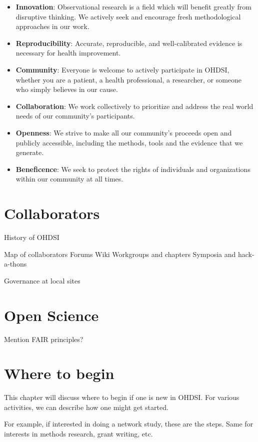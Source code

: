 \documentclass[11pt]{book}
\begin{document}
\begin{itemize}
\item
  \textbf{Innovation}: Observational research is a field which will
  benefit greatly from disruptive thinking. We actively seek and
  encourage fresh methodological approaches in our work.
\item
  \textbf{Reproducibility}: Accurate, reproducible, and well-calibrated
  evidence is necessary for health improvement.
\item
  \textbf{Community}: Everyone is welcome to actively participate in
  OHDSI, whether you are a patient, a health professional, a researcher,
  or someone who simply believes in our cause.
\item
  \textbf{Collaboration}: We work collectively to prioritize and address
  the real world needs of our community's participants.
\item
  \textbf{Openness}: We strive to make all our community's proceeds open
  and publicly accessible, including the methods, tools and the evidence
  that we generate.
\item
  \textbf{Beneficence}: We seek to protect the rights of individuals and
  organizations within our community at all times.
\end{itemize}

\chapter{Collaborators}\label{Collaborators}

History of OHDSI

Map of collaborators Forums Wiki Workgroups and chapters Symposia and
hack-a-thons

Governance at local sites

\chapter{Open Science}\label{OpenScience}

Mention FAIR principles?

\chapter{Where to begin}\label{WhereToBegin}

This chapter will discuss where to begin if one is new in OHDSI. For
various activities, we can describe how one might get started.

For example, if interested in doing a network study, these are the
steps. Same for interests in methods research, grant writing, etc.
\end{document}
